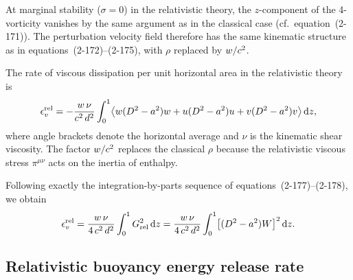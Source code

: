 At marginal stability ($\sigma = 0$) in the relativistic theory, the
$z$-component of the 4-vorticity vanishes by the same argument as in
the classical case (cf.\ equation~(2-171)).  The perturbation velocity
field therefore has the same kinematic structure as in
equations~(2-172)--(2-175), with $\rho$ replaced by $w/c^2$.

The rate of viscous dissipation per unit horizontal area in the
relativistic theory is
\begin{equation}
\label{eq:rel-2-176}
\epsilon_v^{\mathrm{rel}} = -\frac{w\,\nu}{c^2\,d^2}
\int_0^1 \bigl\langle
  w(D^2-a^2)w + u(D^2-a^2)u + v(D^2-a^2)v
\bigr\rangle\,\mathrm{d}z,
\end{equation}
where angle brackets denote the horizontal average and $\nu$ is the
kinematic shear viscosity.  The factor $w/c^2$ replaces
the classical $\rho$ because the relativistic viscous stress
$\pi^{\mu\nu}$ acts on the inertia of enthalpy.

Following exactly the integration-by-parts sequence of
equations~(2-177)--(2-178), we obtain
\begin{equation}
\label{eq:rel-2-178}
\epsilon_v^{\mathrm{rel}}
= \frac{w\,\nu}{4\,c^2\,d^2}
\int_0^1 G_{\mathrm{rel}}^2\,\mathrm{d}z
= \frac{w\,\nu}{4\,c^2\,d^2}
\int_0^1 \bigl[(D^2-a^2)W\bigr]^2\,\mathrm{d}z.
\end{equation}

\subsection{Relativistic buoyancy energy release rate}\label{sec:rel-14b}

